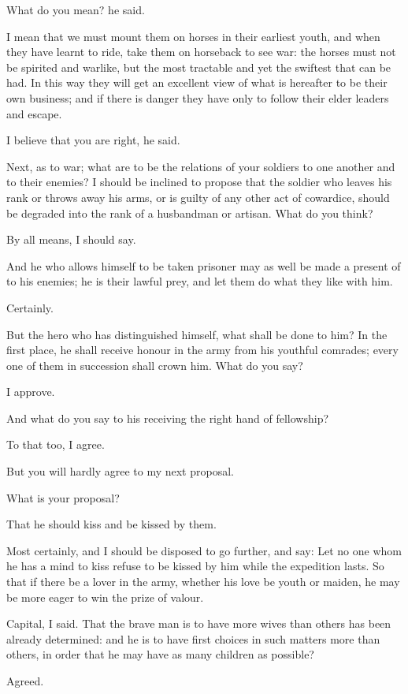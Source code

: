 What do you mean? he said.

I mean that we must mount them on horses in their earliest youth, and
when they have learnt to ride, take them on horseback to see war: the
horses must not be spirited and warlike, but the most tractable and yet
the swiftest that can be had. In this way they will get an excellent
view of what is hereafter to be their own business; and if there is
danger they have only to follow their elder leaders and escape.

I believe that you are right, he said.

Next, as to war; what are to be the relations of your soldiers to one
another and to their enemies? I should be inclined to propose that the
soldier who leaves his rank or throws away his arms, or is guilty of any
other act of cowardice, should be degraded into the rank of a husbandman
or artisan. What do you think?

By all means, I should say.

And he who allows himself to be taken prisoner may as well be made a
present of to his enemies; he is their lawful prey, and let them do what
they like with him.

Certainly.

But the hero who has distinguished himself, what shall be done to
him? In the first place, he shall receive honour in the army from his
youthful comrades; every one of them in succession shall crown him. What
do you say?

I approve.

And what do you say to his receiving the right hand of fellowship?

To that too, I agree.

But you will hardly agree to my next proposal.

What is your proposal?

That he should kiss and be kissed by them.

Most certainly, and I should be disposed to go further, and say: Let
no one whom he has a mind to kiss refuse to be kissed by him while the
expedition lasts. So that if there be a lover in the army, whether
his love be youth or maiden, he may be more eager to win the prize of
valour.

Capital, I said. That the brave man is to have more wives than others
has been already determined: and he is to have first choices in such
matters more than others, in order that he may have as many children as
possible?

Agreed.

